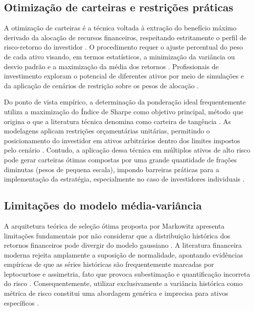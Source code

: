 \subsection{Otimização de carteiras e restrições práticas}
\label{subsec_otimizacao_de_carteiras_e_restricoes_praticas}

A otimização de carteiras é a técnica voltada à extração do benefício máximo derivado da alocação de recursos financeiros, respeitando estritamente o perfil de risco-retorno do investidor \cite{jeleskovic2024cryptocurrency}. O procedimento requer o ajuste percentual do peso de cada ativo visando, em termos estatísticos, a minimização da variância ou desvio padrão e a maximização da média dos retornos \cite{jeleskovic2024cryptocurrency}. Profissionais de investimento exploram o potencial de diferentes ativos por meio de simulações e da aplicação de cenários de restrição sobre os pesos de alocação \cite{bakry2021bitcoin}.

Do ponto de vista empírico, a determinação da ponderação ideal frequentemente utiliza a maximização do Índice de Sharpe como objetivo principal, método que origina o que a literatura técnica denomina como carteira de tangência \cite{jeleskovic2024cryptocurrency}. As modelagens aplicam restrições orçamentárias unitárias, permitindo o posicionamento do investidor em ativos arbitrários dentro dos limites impostos pelo cenário \cite{bakry2021bitcoin}. Contudo, a aplicação dessa técnica em múltiplos ativos de alto risco pode gerar carteiras ótimas compostas por uma grande quantidade de frações diminutas (pesos de pequena escala), impondo barreiras práticas para a implementação da estratégia, especialmente no caso de investidores individuais \cite{chaweewanchon2022markowitz}.

\subsection{Limitações do modelo média-variância}
\label{subsec_limitacoes_do_modelo_media_variancia}

A arquitetura teórica de seleção ótima proposta por Markowitz apresenta limitações fundamentais por não considerar que a distribuição histórica dos retornos financeiros pode divergir do modelo gaussiano \cite{jeleskovic2024cryptocurrency}. A literatura financeira moderna rejeita amplamente a suposição de normalidade, apontando evidências empíricas de que as séries históricas são frequentemente marcadas por leptocurtose e assimetria, fato que provoca subestimação e quantificação incorreta do risco \cite{jeleskovic2024cryptocurrency}. Consequentemente, utilizar exclusivamente a variância histórica como métrica de risco constitui uma abordagem genérica e imprecisa para ativos específicos \cite{jeleskovic2024cryptocurrency}.

